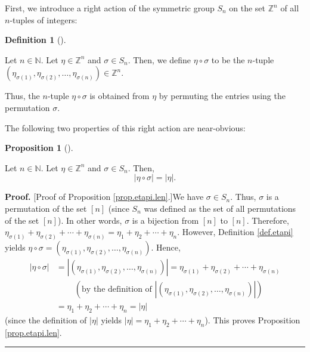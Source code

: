 \documentclass
[numbers=enddot,12pt,final,onecolumn,notitlepage,english]{scrartcl}%
\theoremstyle{definition}
\newtheorem{prop}[theo]{Proposition}
\newenvironment{proposition}[1][]
{\begin{prop}[#1]\begin{leftbar}}
{\end{leftbar}\end{prop}}
\newtheorem{defi}[theo]{Definition}
\newenvironment{definition}[1][]
{\begin{defi}[#1]\begin{leftbar}}
{\end{leftbar}\end{defi}}
\newenvironment{proof}[1][Proof]{\noindent\textbf{#1.} }{\ \rule{0.5em}{0.5em}}
\newenvironment{verlong}{}{}
\begin{document}
First, we introduce a right action of the symmetric group $S_{n}$ on the set
$\mathbb{Z}^{n}$ of all $n$-tuples of integers:

\begin{definition}
\label{def.etapi}Let $n\in\mathbb{N}$. Let $\eta\in\mathbb{Z}^{n}$ and
$\sigma\in S_{n}$. Then, we define $\eta\circ\sigma$ to be the $n$-tuple
$\left(  \eta_{\sigma\left(  1\right)  },\eta_{\sigma\left(  2\right)
},\ldots,\eta_{\sigma\left(  n\right)  }\right)  \in\mathbb{Z}^{n}$.
\end{definition}

Thus, the $n$-tuple $\eta\circ\sigma$ is obtained from $\eta$ by permuting the
entries using the permutation $\sigma$.

The following two properties of this right action are near-obvious:

\begin{proposition}
\label{prop.etapi.len}Let $n\in\mathbb{N}$. Let $\eta\in\mathbb{Z}^{n}$ and
$\sigma\in S_{n}$. Then,
\[
\left\vert \eta\circ\sigma\right\vert =\left\vert \eta\right\vert .
\]

\end{proposition}

\begin{verlong}
\begin{proof}
[Proof of Proposition \ref{prop.etapi.len}.]We have $\sigma\in S_{n}$. Thus,
$\sigma$ is a permutation of the set $\left[  n\right]  $ (since $S_{n}$ was
defined as the set of all permutations of the set $\left[  n\right]  $). In
other words, $\sigma$ is a bijection from $\left[  n\right]  $ to $\left[
n\right]  $. Therefore, $\eta_{\sigma\left(  1\right)  }+\eta_{\sigma\left(
2\right)  }+\cdots+\eta_{\sigma\left(  n\right)  }=\eta_{1}+\eta_{2}%
+\cdots+\eta_{n}$. However, Definition \ref{def.etapi} yields $\eta\circ
\sigma=\left(  \eta_{\sigma\left(  1\right)  },\eta_{\sigma\left(  2\right)
},\ldots,\eta_{\sigma\left(  n\right)  }\right)  $. Hence,%
\begin{align*}
\left\vert \eta\circ\sigma\right\vert  &  =\left\vert \left(  \eta
_{\sigma\left(  1\right)  },\eta_{\sigma\left(  2\right)  },\ldots
,\eta_{\sigma\left(  n\right)  }\right)  \right\vert =\eta_{\sigma\left(
1\right)  }+\eta_{\sigma\left(  2\right)  }+\cdots+\eta_{\sigma\left(
n\right)  }\\
&  \ \ \ \ \ \ \ \ \ \ \left(  \text{by the definition of }\left\vert \left(
\eta_{\sigma\left(  1\right)  },\eta_{\sigma\left(  2\right)  },\ldots
,\eta_{\sigma\left(  n\right)  }\right)  \right\vert \right) \\
&  =\eta_{1}+\eta_{2}+\cdots+\eta_{n}=\left\vert \eta\right\vert
\end{align*}
(since the definition of $\left\vert \eta\right\vert $ yields $\left\vert
\eta\right\vert =\eta_{1}+\eta_{2}+\cdots+\eta_{n}$). This proves Proposition
\ref{prop.etapi.len}.
\end{proof}
\end{verlong}
\end{document}
